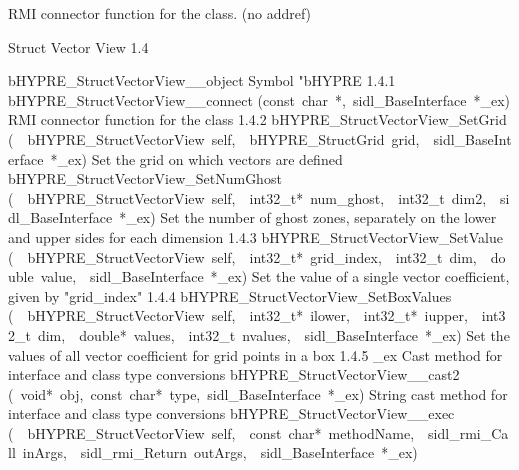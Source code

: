 \documentclass{article}
\begin{document}
\begin{cxxentry}
\begin{cxxentry}
\begin{cxxvariable}
\begin{cxxdoc}
RMI connector function for the class. (no addref)
\end{cxxdoc}
\end{cxxvariable}
\end{cxxentry}
\begin{cxxentry}
{}
        {Struct Vector View}
        {}
        {
}
        {1.4}
\begin{cxxnames}
        {bHYPRE\_StructVectorView\_\_object}
        {}
        {
Symbol "bHYPRE}
        {1.4.1}
        {bHYPRE\_StructVectorView\_\_connect}
        {(const\ char\ *,\ sidl\_BaseInterface\ *\_ex)}
        {
RMI connector function for the class}
        {1.4.2}
        {bHYPRE\_StructVectorView\_SetGrid}
        {(\ \ bHYPRE\_StructVectorView\ self,\ \ bHYPRE\_StructGrid\ grid,\ \ sidl\_BaseInterface\ *\_ex)}
        {
Set the grid on which vectors are defined}
        {}
\label{cxx.1.4.7}
        {bHYPRE\_StructVectorView\_SetNumGhost}
        {(\ \ bHYPRE\_StructVectorView\ self,\ \ int32\_t*\ num\_ghost,\ \ int32\_t\ dim2,\ \ sidl\_BaseInterface\ *\_ex)}
        {
Set the number of ghost zones, separately on the lower and upper sides
for each dimension}
        {1.4.3}
        {bHYPRE\_StructVectorView\_SetValue}
        {(\ \ bHYPRE\_StructVectorView\ self,\ \ int32\_t*\ grid\_index,\ \ int32\_t\ dim,\ \ double\ value,\ \ sidl\_BaseInterface\ *\_ex)}
        {
Set the value of a single vector coefficient, given by "grid\_index"}
        {1.4.4}
        {bHYPRE\_StructVectorView\_SetBoxValues}
        {(\ \ bHYPRE\_StructVectorView\ self,\ \ int32\_t*\ ilower,\ \ int32\_t*\ iupper,\ \ int32\_t\ dim,\ \ double*\ values,\ \ int32\_t\ nvalues,\ \ sidl\_BaseInterface\ *\_ex)}
        {
Set the values of all vector coefficient for grid points in a box}
        {1.4.5}
        {\_ex}
        {}
        {
Cast method for interface and class type conversions}
        {}
\label{cxx.1.4.8}
        {bHYPRE\_StructVectorView\_\_cast2}
        {(\ void*\ obj,\ const\ char*\ type,\ sidl\_BaseInterface\ *\_ex)}
        {
String cast method for interface and class type conversions}
        {}
\label{cxx.1.4.9}
        {bHYPRE\_StructVectorView\_\_exec}
        {(\ \ bHYPRE\_StructVectorView\ self,\ \ const\ char*\ methodName,\ \ sidl\_rmi\_Call\ inArgs,\ \ sidl\_rmi\_Return\ outArgs,\ \ sidl\_BaseInterface\ *\_ex)}

\end{cxxnames}
\end{cxxentry}
\end{cxxentry}
\end{document}
